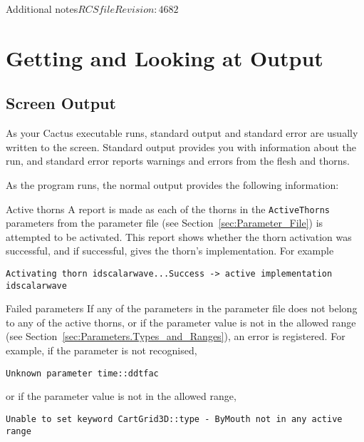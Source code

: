 \begin{cactuspart}{Additional notes}{$RCSfile$}{$Revision: 4682 $}


\chapter{Getting and Looking at Output}


\section{Screen Output}

As your Cactus executable runs, standard output and standard error
are usually written to the screen. Standard output provides you
with information about the run, and standard error reports warnings
and errors from the flesh and thorns.

As the program runs, the normal output provides the following information:

\begin{Lentry}

\item [Active thorns]
        A report is made as each of the thorns in the \texttt{ActiveThorns}
parameters from the parameter file (see Section~\ref{sec:Parameter_File})
is attempted to be activated. This report
shows whether the thorn activation was successful, and if successful, gives the
thorn's implementation. For example

\begin{verbatim}
Activating thorn idscalarwave...Success -> active implementation idscalarwave
\end{verbatim}

\item [Failed parameters]
         If any of the parameters in the parameter file does not belong to any
of the active thorns, or if the parameter value is not in the allowed range
(see Section~\ref{sec:Parameters.Types_and_Ranges}),
an error is registered. For example, if the parameter is not recognised,

\begin{verbatim}
Unknown parameter time::ddtfac
\end{verbatim}
or if the parameter value is not in the allowed range,

\begin{verbatim}
Unable to set keyword CartGrid3D::type - ByMouth not in any active range
\end{verbatim}


\end{Lentry}
\end{cactuspart}
